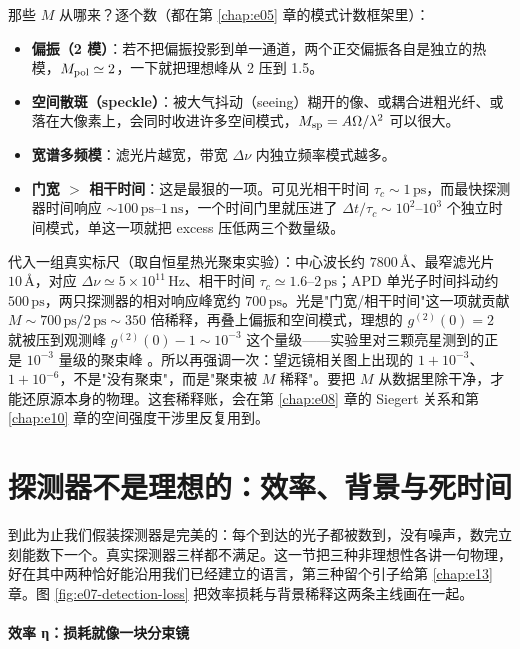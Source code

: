 那些 \(M\) 从哪来？逐个数（都在第 \ref{chap:e05} 章的模式计数框架里）：

\begin{itemize}
  \item \textbf{偏振（2 模）}：若不把偏振投影到单一通道，两个正交偏振各自是独立的热模，\(M_{\rm pol}\simeq2\)，一下就把理想峰从 2 压到 1.5。
  \item \textbf{空间散斑（speckle）}：被大气抖动（seeing）糊开的像、或耦合进粗光纤、或落在大像素上，会同时收进许多空间模式，\(M_{\rm sp}=A\Omega/\lambda^2\) 可以很大。
  \item \textbf{宽谱多频模}：滤光片越宽，带宽 \(\Delta\nu\) 内独立频率模式越多。
  \item \textbf{门宽 \(>\) 相干时间}：这是最狠的一项。可见光相干时间 \(\tau_c\sim1\,\mathrm{ps}\)，而最快探测器时间响应 \(\sim100\,\mathrm{ps}\)–\(1\,\mathrm{ns}\)，一个时间门里就压进了 \(\Delta t/\tau_c\sim10^2\)–\(10^3\) 个独立时间模式，单这一项就把 excess 压低两三个数量级。
\end{itemize}

代入一组真实标尺（取自恒星热光聚束实验）：中心波长约 \(7800\,\text{\AA}\)、最窄滤光片 \(10\,\text{\AA}\)，对应 \(\Delta\nu\simeq5\times10^{11}\,\mathrm{Hz}\)、相干时间 \(\tau_c\simeq1.6\)–\(2\,\mathrm{ps}\)；APD 单光子时间抖动约 \(500\,\mathrm{ps}\)，两只探测器的相对响应峰宽约 \(700\,\mathrm{ps}\)。光是"门宽/相干时间"这一项就贡献 \(M\sim700\,\mathrm{ps}/2\,\mathrm{ps}\sim350\) 倍稀释，再叠上偏振和空间模式，理想的 \(g^{(2)}(0)=2\) 就被压到观测峰 \(g^{(2)}(0)-1\sim10^{-3}\) 这个量级——实验里对三颗亮星测到的正是 \(10^{-3}\) 量级的聚束峰 \citep{2017MNRAS.472.4126G}。所以再强调一次：望远镜相关图上出现的 \(1+10^{-3}\)、\(1+10^{-6}\)，不是"没有聚束"，而是"聚束被 \(M\) 稀释"。要把 \(M\) 从数据里除干净，才能还原源本身的物理。这套稀释账，会在第 \ref{chap:e08} 章的 Siegert 关系和第 \ref{chap:e10} 章的空间强度干涉里反复用到。

\section{探测器不是理想的：效率、背景与死时间}
\label{sec:e07-nonideal}

到此为止我们假装探测器是完美的：每个到达的光子都被数到，没有噪声，数完立刻能数下一个。真实探测器三样都不满足。这一节把三种非理想性各讲一句物理，好在其中两种恰好能沿用我们已经建立的语言，第三种留个引子给第 \ref{chap:e13} 章。图 \ref{fig:e07-detection-loss} 把效率损耗与背景稀释这两条主线画在一起。

\paragraph{效率 η：损耗就像一块分束镜}
\label{sec:e07-efficiency}

